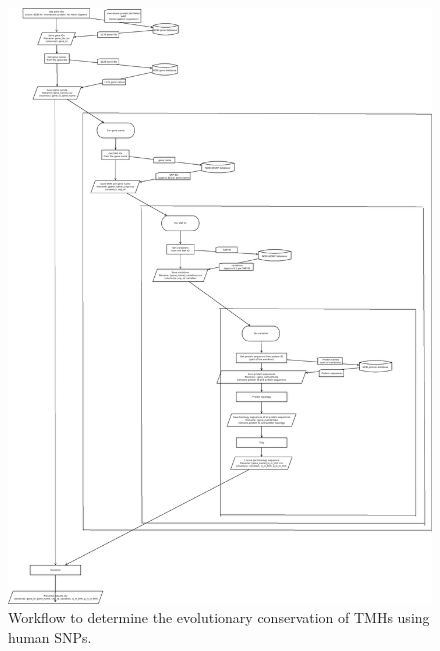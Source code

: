 \begin{figure}[!htbp]
  \includegraphics[height=0.9\textheight]{snp_workflow.png}
  \caption{
    Workflow to determine the evolutionary conservation of TMHs
    using human SNPs.
  }
  \label{fig:snp_workflow}
\end{figure}


% 
% 
% 

